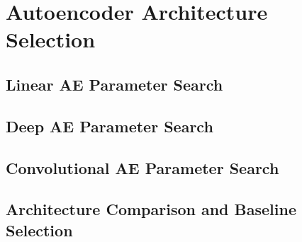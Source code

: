 \section{Autoencoder Architecture Selection}
\subsection{Linear AE Parameter Search}
\subsection{Deep AE Parameter Search}
\subsection{Convolutional AE Parameter Search}
\subsection{Architecture Comparison and Baseline Selection}

